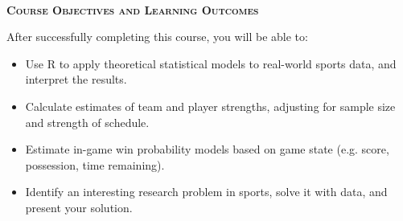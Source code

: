 \documentclass[11pt]{article}
\begin{document}
~\\
\textbf{\textsc{Course Objectives and Learning Outcomes}}
\begin{adjustwidth}{1cm}{0cm}
  After successfully completing this course, you will be able to:
  \begin{itemize}
    \item Use R to apply theoretical statistical models to real-world sports data, and interpret the results.
    \item Calculate estimates of team and player strengths, adjusting for sample size and strength of schedule.
    \item Estimate in-game win probability models based on game state (e.g. score, possession, time remaining).
    \item Identify an interesting research problem in sports, solve it with data, and present your solution.
  \end{itemize}
\end{adjustwidth}
\end{document}
